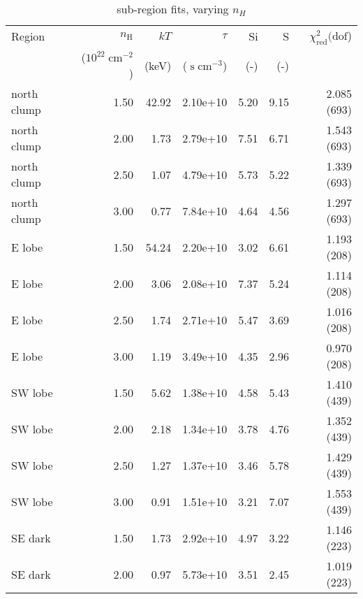 \documentclass[preprint2,tighten,trackchanges]{aastex6}
\newcommand*{\mt}{\mathrm}
\newcommand*{\unit}[1]{\;\mt{#1}}  %
\begin{document}
\begin{table*}
    \centering
    \caption{sub-region fits, varying $n_H$}
    \begin{tabular}{@{}lrrrrrr@{}}
        \toprule
        Region & $n_\mathrm{H}$             & $kT$  & $\tau$                & Si  & S   & $\chi^2_{\mathrm{red}} (\mathrm{dof}$) \\
               & ($10^{22} \unit{cm^{-2}}$) & (keV) & ($\unit{s\;cm^{-3}}$) & (-) & (-) &  \\
        \midrule
        north clump & 1.50 & 42.92 & 2.10e+10 & 5.20 & 9.15 & 2.085 (693) \\  %
        north clump & 2.00 & 1.73 & 2.79e+10 & 7.51 & 6.71 & 1.543 (693) \\  %
        north clump & 2.50 & 1.07 & 4.79e+10 & 5.73 & 5.22 & 1.339 (693) \\  %
        north clump & 3.00 & 0.77 & 7.84e+10 & 4.64 & 4.56 & 1.297 (693) \\  %
        \midrule
        E lobe & 1.50 & 54.24 & 2.20e+10 & 3.02 & 6.61 & 1.193 (208) \\  %
        E lobe & 2.00 & 3.06 & 2.08e+10 & 7.37 & 5.24 & 1.114 (208) \\  %
        E lobe & 2.50 & 1.74 & 2.71e+10 & 5.47 & 3.69 & 1.016 (208) \\  %
        E lobe & 3.00 & 1.19 & 3.49e+10 & 4.35 & 2.96 & 0.970 (208) \\  %
        \midrule
        SW lobe & 1.50 & 5.62 & 1.38e+10 & 4.58 & 5.43 & 1.410 (439) \\  %
        SW lobe & 2.00 & 2.18 & 1.34e+10 & 3.78 & 4.76 & 1.352 (439) \\  %
        SW lobe & 2.50 & 1.27 & 1.37e+10 & 3.46 & 5.78 & 1.429 (439) \\  %
        SW lobe & 3.00 & 0.91 & 1.51e+10 & 3.21 & 7.07 & 1.553 (439) \\  %
        \midrule
        SE dark & 1.50 & 1.73 & 2.92e+10 & 4.97 & 3.22 & 1.146 (223) \\  %
        SE dark & 2.00 & 0.97 & 5.73e+10 & 3.51 & 2.45 & 1.019 (223) \\  %

\end{tabular}
\end{table*}
\end{document}
